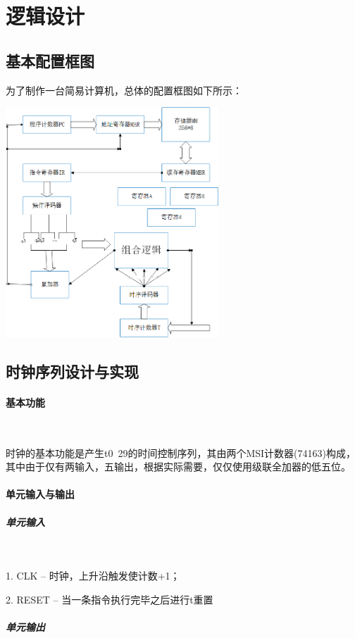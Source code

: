 \documentclass[UTF8]{ctexart}
\begin{document}
    \section{逻辑设计}
    \subsection{基本配置框图}
    为了制作一台简易计算机，总体的配置框图如下所示：

    \includegraphics[width=0.6\textwidth]{./img/简易计算机配置框图.png}

    \subsection{时钟序列设计与实现}
    \paragraph{基本功能}

    ~

    时钟的基本功能是产生t0~29的时间控制序列，其由两个MSI计数器(74163)构成，其中由于仅有两输入，五输出，根据实际需要，仅仅使用级联全加器的低五位。

    \paragraph{单元输入与输出}

    \subparagraph{单元输入}

    ~

    1. CLK -- 时钟，上升沿触发使计数+1；

    2. RESET -- 当一条指令执行完毕之后进行t重置

    \subparagraph{单元输出}
\end{document}
